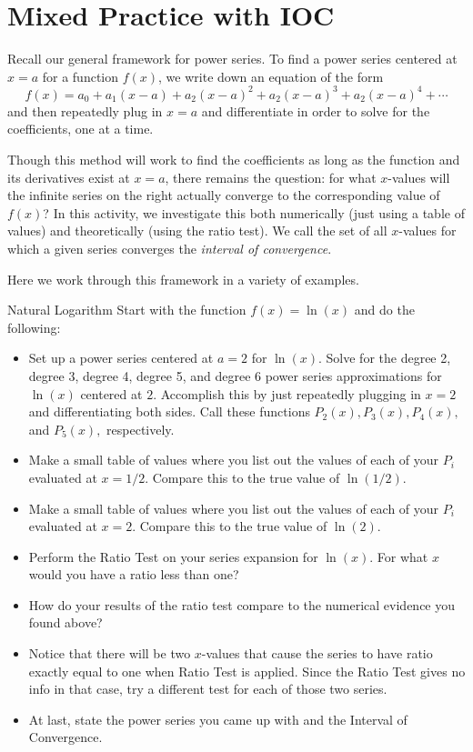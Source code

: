 
\section{Mixed Practice with IOC} 
Recall our general framework for power series.  To find a power series centered at $x=a$ for a function $f(x)$, we write down an equation of the form $$ f(x)=a_0+a_1(x-a)+a_2(x-a)^2+a_2(x-a)^3+a_2(x-a)^4+\cdots$$
and then repeatedly plug in $x=a$ and differentiate in order to solve for the coefficients, one at a time.

Though this method will work to find the coefficients as long as the function and its derivatives exist at $x=a$, there remains the question: for what $x$-values will the infinite series on the right actually converge to the corresponding value of $f(x)$?  In this activity, we investigate this both numerically (just using a table of values) and theoretically (using the ratio test).  We call the set of all $x$-values for which a given series converges the \emph{interval of convergence}.

Here we work through this framework in a variety of examples.

\begin{exercise}{Natural Logarithm \Coffeecup \Coffeecup \Coffeecup}
Start with the function $f(x)=\ln(x)$ and do the following:

\begin{itemize}
\item Set up a power series centered at $a=2$ for $\ln(x)$.  Solve for the degree 2, degree 3, degree 4, degree 5, and degree 6 power series approximations for $\ln(x)$ centered at $2$.  Accomplish this by just repeatedly plugging in $x=2$ and differentiating both sides.  Call these functions $P_2(x), P_3(x), P_4(x),$ and  $P_5(x),$ respectively.
\item Make a small table of values where you list out the values of each of your $P_i$ evaluated at $x=1/2$.  Compare this to the true value of $\ln(1/2)$.  
\item Make a small table of values where you list out the values of each of your $P_i$ evaluated at $x=2$.  Compare this to the true value of $\ln(2)$.
\item Perform the Ratio Test on your series expansion for $\ln(x)$.  For what $x$ would you have a ratio less than one?
\item How do your results of the ratio test compare to the numerical evidence you found above?
\item Notice that there will be two $x$-values that cause the series to have ratio exactly equal to one when Ratio Test is applied.  Since the Ratio Test gives no info in that case, try a different test for each of those two series.  
\item At last, state the power series you came up with and the Interval of Convergence.
\end{itemize}
\end{exercise}

